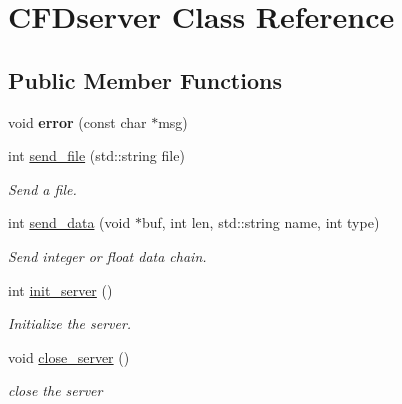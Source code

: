 \hypertarget{class_c_f_dserver}{}\section{C\+F\+Dserver Class Reference}
\label{class_c_f_dserver}
\subsection*{Public Member Functions}
\begin{DoxyCompactItemize}
\item 
\mbox{\label{class_c_f_dserver_a72289d07d5a1932d9670f5a8e18caabc}} 
void {\bfseries error} (const char $\ast$msg)
\item 
\mbox{\label{class_c_f_dserver_a2e900b238ae8e0ea49095a4131754377}} 
int \mbox{\hyperlink{class_c_f_dserver_a2e900b238ae8e0ea49095a4131754377}{send\+\_\+file}} (std\+::string file)
\begin{DoxyCompactList}\small\item\em Send a file. \end{DoxyCompactList}\item 
\mbox{\label{class_c_f_dserver_aeccf668d3d88a2b7fb9a36b2787dab75}} 
int \mbox{\hyperlink{class_c_f_dserver_aeccf668d3d88a2b7fb9a36b2787dab75}{send\+\_\+data}} (void $\ast$buf, int len, std\+::string name, int type)
\begin{DoxyCompactList}\small\item\em Send integer or float data chain. \end{DoxyCompactList}\item 
\mbox{\label{class_c_f_dserver_a4814827571a20380815602968c543c57}} 
int \mbox{\hyperlink{class_c_f_dserver_a4814827571a20380815602968c543c57}{init\+\_\+server}} ()
\begin{DoxyCompactList}\small\item\em Initialize the server. \end{DoxyCompactList}\item 
\mbox{\label{class_c_f_dserver_af0328bb5423ae80c99313ea633e1c000}} 
void \mbox{\hyperlink{class_c_f_dserver_af0328bb5423ae80c99313ea633e1c000}{close\+\_\+server}} ()
\begin{DoxyCompactList}\small\item\em close the server \end{DoxyCompactList}\end{DoxyCompactItemize}
